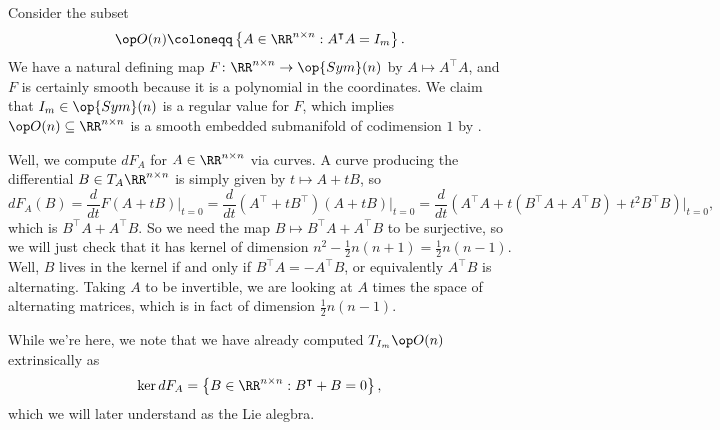 \documentclass[../notes.tex]{subfiles}
\begin{document}
\begin{example}
	Consider the subset
	\[\op O(n)\coloneqq\left\{A\in\RR^{n\times n}:A^\intercal A=I_m\right\}.\]
	We have a natural defining map $F\colon\RR^{n\times n}\to\op{Sym}(n)$ by $A\mapsto A^\intercal A$, and $F$ is certainly smooth because it is a polynomial in the coordinates. We claim that $I_m\in\op{Sym}(n)$ is a regular value for $F$, which implies $\op O(n)\subseteq\RR^{n\times n}$ is a smooth embedded submanifold of codimension $1$ by .
	
	Well, we compute $dF_A$ for $A\in\RR^{n\times n}$ via curves. A curve producing the differential $B\in T_A\RR^{n\times n}$ is simply given by $t\mapsto A+tB$, so
	\[dF_A(B)=\frac d{dt}F(A+tB)\bigg|_{t=0}=\frac d{dt}(A^\intercal+tB^\intercal)(A+tB)\bigg|_{t=0}=\frac d{dt}\left(A^\intercal A+t(B^\intercal A+A^\intercal B)+t^2B^\intercal B\right)\bigg|_{t=0},\]
	which is $B^\intercal A+A^\intercal B$. So we need the map $B\mapsto B^\intercal A+A^\intercal B$ to be surjective, so we will just check that it has kernel of dimension $n^2-\frac12n(n+1)=\frac12n(n-1)$. Well, $B$ lives in the kernel if and only if $B^\intercal A=-A^\intercal B$, or equivalently $A^\intercal B$ is alternating. Taking $A$ to be invertible, we are looking at $A$ times the space of alternating matrices, which is in fact of dimension $\frac12n(n-1)$.
\end{example}
\begin{remark}
	While we're here, we note that we have already computed $T_{I_m}\op O(n)$ extrinsically as
	\[\ker dF_A=\left\{B\in\RR^{n\times n}:B^\intercal+B=0\right\},\]
	which we will later understand as the Lie alegbra.
\end{remark}
\end{document}
